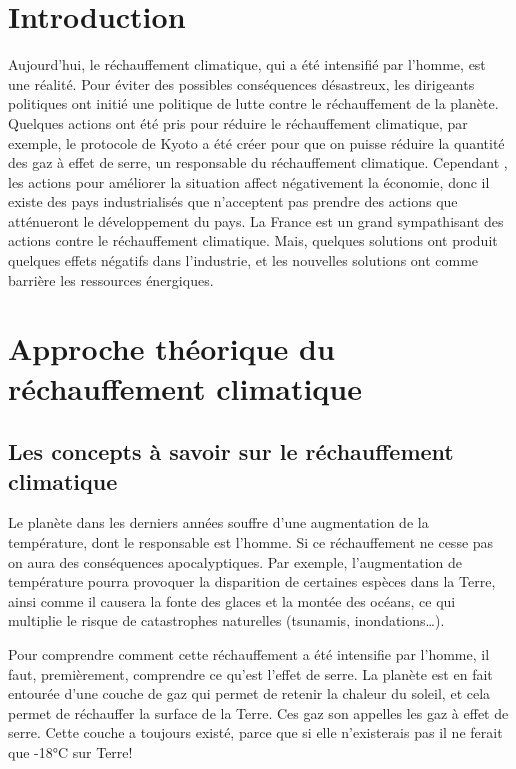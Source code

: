 \documentclass[a4paper,11pt]{article}
\begin{document}
\titleTMB 
\newpage
\tableofcontents
\newpage

\section*{Introduction}

Aujourd'hui, le réchauffement  climatique, qui a été intensifié par l’homme, est une réalité.
Pour éviter des possibles conséquences désastreux, les dirigeants politiques ont initié une politique de lutte contre le réchauffement de la planète. 
Quelques actions ont été pris pour réduire le réchauffement climatique, par exemple, le protocole de Kyoto a été créer pour que on puisse réduire la quantité des gaz à effet de serre, un responsable du réchauffement climatique. Cependant , les actions pour améliorer la situation affect négativement  la économie, donc il existe des pays industrialisés que n’acceptent pas prendre des actions que atténueront  le développement du pays.
La France est un grand sympathisant des actions contre le réchauffement climatique. Mais, quelques solutions ont produit quelques effets négatifs dans l’industrie, et les nouvelles solutions ont  comme barrière les ressources énergiques.

\section{Approche théorique du réchauffement climatique}
\subsection{Les concepts à savoir sur le réchauffement climatique}

Le  planète  dans   les  derniers  années  souffre  d'une   augmentation  de  la
température, dont le responsable est l'homme. Si ce réchauffement ne cesse pas
on  aura  des  conséquences   apocalyptiques.  Par  exemple,  l'augmentation  de
température pourra provoquer la disparition  de certaines espèces dans la Terre,
ainsi comme il causera la fonte des glaces et la montée des océans, ce qui multiplie le risque de catastrophes naturelles (tsunamis, inondations…).


Pour comprendre  comment cette  réchauffement a été  intensifie par  l'homme, il
faut, premièrement, comprendre ce qu’est l’effet de serre. 
La planète est en fait entourée d’une couche de gaz qui permet de retenir la
chaleur du soleil, et cela permet de  réchauffer la surface de la Terre. Ces gaz
son appelles les gaz à effet de serre. 
Cette couche a toujours existé, parce  que si elle n'existerais pas il ne ferait
que -18°C sur Terre!
\end{document}
